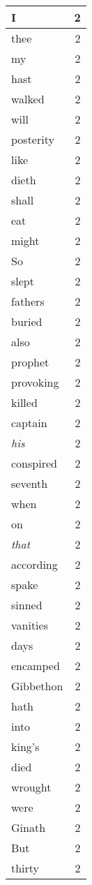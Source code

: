 \begin{center}
\begin{longtable}{l|r}
I & 2\\ \hline 
thee & 2\\ \hline 
my & 2\\ \hline 
hast & 2\\ \hline 
walked & 2\\ \hline 
will & 2\\ \hline 
posterity & 2\\ \hline 
like & 2\\ \hline 
dieth & 2\\ \hline 
shall & 2\\ \hline 
eat & 2\\ \hline 
might & 2\\ \hline 
So & 2\\ \hline 
slept & 2\\ \hline 
fathers & 2\\ \hline 
buried & 2\\ \hline 
also & 2\\ \hline 
prophet & 2\\ \hline 
provoking & 2\\ \hline 
killed & 2\\ \hline 
captain & 2\\ \hline 
\emph{his} & 2\\ \hline 
conspired & 2\\ \hline 
seventh & 2\\ \hline 
when & 2\\ \hline 
on & 2\\ \hline 
\emph{that} & 2\\ \hline 
according & 2\\ \hline 
spake & 2\\ \hline 
sinned & 2\\ \hline 
vanities & 2\\ \hline 
days & 2\\ \hline 
encamped & 2\\ \hline 
Gibbethon & 2\\ \hline 
hath & 2\\ \hline 
into & 2\\ \hline 
king's & 2\\ \hline 
died & 2\\ \hline 
wrought & 2\\ \hline 
were & 2\\ \hline 
Ginath & 2\\ \hline 
But & 2\\ \hline 
thirty & 2\\ \hline 

\end{longtable}
\end{center}
